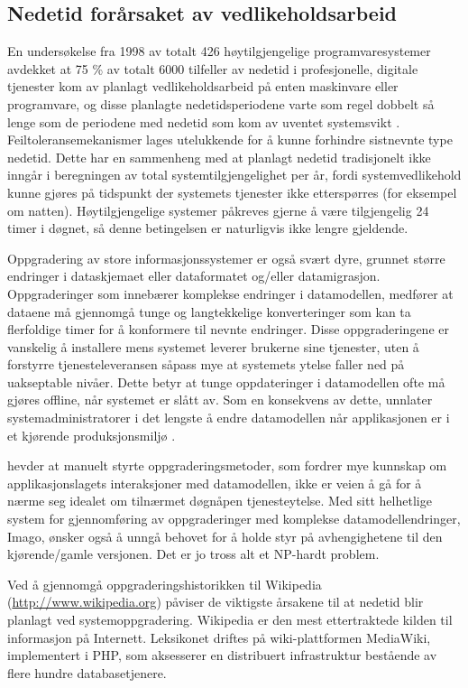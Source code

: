 \subsection{Nedetid forårsaket av vedlikeholdsarbeid}

En undersøkelse fra 1998 av totalt 426 høytilgjengelige programvaresystemer avdekket at 75 \% av totalt 6000 tilfeller av nedetid i profesjonelle, digitale tjenester kom av planlagt vedlikeholdsarbeid på enten maskinvare eller programvare, og disse planlagte nedetidsperiodene varte som regel dobbelt så lenge som de periodene med nedetid som kom av uventet systemsvikt \citep{lowell2004, dumitras2009nodowntime}. Feiltoleransemekanismer lages utelukkende for å kunne forhindre sistnevnte type nedetid. Dette har en sammenheng med at planlagt nedetid tradisjonelt ikke inngår i beregningen av total systemtilgjengelighet per år, fordi systemvedlikehold kunne gjøres på tidspunkt der systemets tjenester ikke etterspørres (for eksempel om natten). Høytilgjengelige systemer påkreves gjerne å være tilgjengelig 24 timer i døgnet, så denne betingelsen er naturligvis ikke lengre gjeldende.

Oppgradering av store informasjonssystemer er også svært dyre, grunnet større endringer i dataskjemaet eller dataformatet og/eller datamigrasjon. Oppgraderinger som innebærer komplekse endringer i datamodellen, medfører at dataene må gjennomgå tunge og langtekkelige konverteringer som kan ta flerfoldige timer for å konformere til nevnte endringer. Disse oppgraderingene er vanskelig å installere mens systemet leverer brukerne sine tjenester, uten å forstyrre tjenesteleveransen såpass mye at systemets ytelse faller ned på uakseptable nivåer. Dette betyr at tunge oppdateringer i datamodellen ofte må gjøres offline, når systemet er slått av. Som en konsekvens av dette, unnlater systemadministratorer i det lengste å endre datamodellen når applikasjonen er i et kjørende produksjonsmiljø \citep{dumitras2009nodowntime}.

\cite{dumitras2009nodowntime} hevder at manuelt styrte oppgraderingsmetoder, som fordrer mye kunnskap om applikasjonslagets interaksjoner med datamodellen, ikke er veien å gå for å nærme seg idealet om tilnærmet døgnåpen tjenesteytelse. Med sitt helhetlige system for gjennomføring av oppgraderinger med komplekse datamodellendringer, Imago, ønsker \cite{dumitras2009nodowntime} også å unngå behovet for å holde styr på avhengighetene til den kjørende/gamle versjonen. Det er jo tross alt et NP-hardt problem.

Ved å gjennomgå oppgraderingshistorikken til Wikipedia (\url{http://www.wikipedia.org}) påviser \cite{dumitras2009nodowntime} de viktigste årsakene til at nedetid blir planlagt ved systemoppgradering. Wikipedia er den mest ettertraktede kilden til informasjon på Internett. Leksikonet driftes på wiki-plattformen MediaWiki, implementert i PHP, som aksesserer en distribuert infrastruktur bestående av flere hundre databasetjenere.


